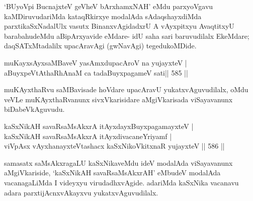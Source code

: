\begin{artha}
`BUyoV\s pi BucnajxteV geVheV bArxhamxNAH' eMdu parxyoVgavu kaMDiruvudariMda kataqRkirxye modalAda sAdaqshayxdiMda parxtikaSxNadalUlx vasutx BinanxvAgidadxrU A vAyxpitxyu AvaqtitxyU barabahudeMdu aBipArxyavide eMdare- idU saha sari baruvudilalx EkeMdare; daqSATxMtadalilx upacAravAgi (gwNavAgi) tegedukoMDide.
\end{artha}

\begin{shl}
\footnotemark[1]muKayxsAyxsaMBaveV yasAmxdupacAroV na yujayxteV | \\
aBuyxpeVtAthaRhAnaM ca tadaBuyxpagameV sati\hfill ||  585 ||  
\end{shl}

\begin{artha}
muKAyxthaRvu saMBavisade hoVdare upacAravU yukatxvAguvudilalx, oMdu veVLe muKAyxthaRvanunx sivxVkarisidare aMgiVkarisada viSayavanunx biDabeVkAguvudu.
\end{artha}


\begin{shl}
kaSxNikAH  savaRsaMsAkxrA itAyxdayxBuyxpagamayxteV | \\
kaSxNikAH  savaRsaMsAkxrA itAyxdivacaneYriyamf | \\
viVpAsx vAyxhanayxteV\s tashacx kaSxNikoVkitxnaR yujayxteV \hfill||  586 ||  
\end{shl}

\begin{artha}
samasatx saMsAkxragaLU kaSxNikaveMdu ideV modalAda viSayavanunx aMgiVkariside, `kaSxNikAH savaRsaMsAkxrAH' eMbudeV modalAda vacanagaLiMda I videyxyu virudadhxvAgide. adariMda kaSxNika vacanavu adara parxtijAcnxvAkayxvu yukatxvAguvudilalx.
\end{artha}

